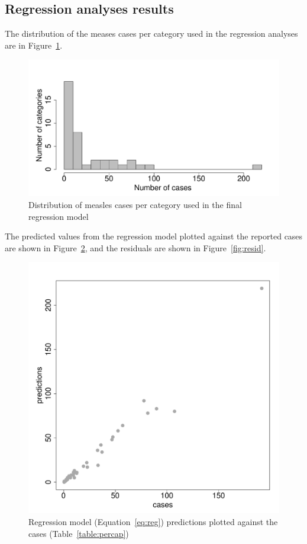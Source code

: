 \documentclass{article}
\begin{document}
\subsection{Regression analyses results}
\label{sub:regression_results}

The distribution of the meases cases per category used in the regression analyses are in Figure~\ref{fig:histcasecat}.
\begin{figure}
\begin{center}
\includegraphics{draftfinalreport-014}
\end{center}
\caption{Distribution of measles cases per category used in the final regression model}
\label{fig:histcasecat}
\end{figure}

The predicted values from the regression model plotted against the reported cases are shown in Figure~\ref{fig:predict}, and the residuals are shown in Figure~\ref{fig:resid}.
\begin{figure}
\begin{center}
\includegraphics{draftfinalreport-015}
\end{center}
\caption{Regression model (Equation~\ref{eq:reg}) predictions plotted against the cases (Table~\ref{table:percap})}
\label{fig:predict}
\end{figure}
\end{document}
